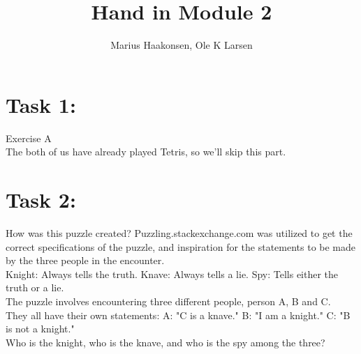 \documentclass[11pt]{amsart}
\title{Hand in Module 2}
\author{Marius Haakonsen, Ole K Larsen}
\begin{document}
\maketitle

\section{Task 1:}

Exercise A  \\
The both of us have already played Tetris, so we'll skip this part.  \\




\section{Task 2:}

How was this puzzle created?
	Puzzling.stackexchange.com was utilized to get the correct specifications of the puzzle,
	and inspiration for the statements to be made by the three people in the encounter. \\

Knight: Always tells the truth.
Knave: 	Always tells a lie.
Spy: 		Tells either the truth or a lie. \\

The puzzle involves encountering three different people, person A, B and C. \\

They all have their own statements:
	A: "C is a knave."
	B: "I am a knight."
	C: "B is not a knight." \\

Who is the knight, who is the knave, and who is the spy among the three? \\
\end{document}
